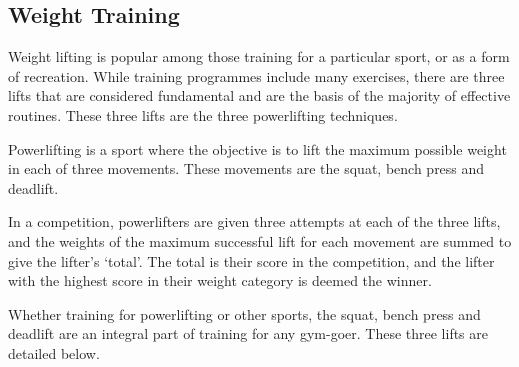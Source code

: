 \subsection{Weight Training}

Weight lifting is popular among those training for a particular sport, or as a form of recreation. While training programmes include many exercises, there are three lifts that are considered fundamental and are the basis of the majority of effective routines. These three lifts are the three powerlifting techniques.

Powerlifting is a sport where the objective is to lift the maximum possible weight in each of three movements. These movements are the squat, bench press and deadlift.

In a competition, powerlifters are given three attempts at each of the three lifts, and the weights of the maximum successful lift for each movement are summed to give the lifter's `total'. The total is their score in the competition, and the lifter with the highest score in their weight category is deemed the winner.

Whether training for powerlifting or other sports, the squat, bench press and deadlift are an integral part of training for any gym-goer. These three lifts are detailed below.





